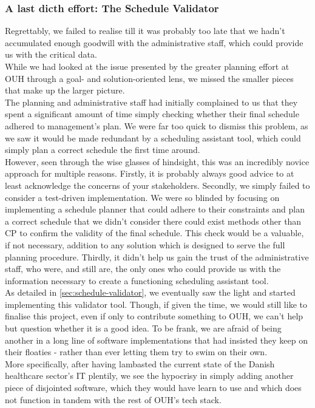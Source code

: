 \subsubsection*{A last dicth effort: The Schedule Validator}
Regrettably, we failed to realise till it was probably too late that we hadn't accumulated enough goodwill with the administrative staff, which could provide us with the critical data. 
\\
While we had looked at the issue presented by the greater planning effort at OUH through a goal- and solution-oriented lens, we missed the smaller pieces that make up the larger picture.
\\
The planning and administrative staff had initially complained to us that they spent a significant amount of time simply checking whether their final schedule adhered to management's plan. We were far too quick to dismiss this problem, as we saw it would be made redundant by a scheduling assistant tool, which could simply plan a correct schedule the first time around.
\\
However, seen through the wise glasses of hindsight, this was an incredibly novice approach for multiple reasons. Firstly, it is probably always good advice to at least acknowledge the concerns of your stakeholders. Secondly, we simply failed to consider a test-driven implementation. We were so blinded by focusing on implementing a schedule planner that could adhere to their constraints and plan a correct schedule that we didn't consider there could exist methods other than CP to confirm the validity of the final schedule. This check would be a valuable, if not necessary, addition to any solution which is designed to serve the full planning procedure. Thirdly, it didn't help us gain the trust of the administrative staff, who were, and still are, the only ones who could provide us with the information necessary to create a functioning scheduling assistant tool. 
\\
As detailed in \autoref{sec:schedule-validator}, we eventually saw the light and started implementing this validator tool. Though, if given the time, we would still like to finalise this project, even if only to contribute something to OUH, we can't help but question whether it is a good idea. To be frank, we are afraid of being another in a long line of software implementations that had insisted they keep on their floaties - rather than ever letting them try to swim on their own.
\\
More specifically, after having lambasted the current state of the Danish healthcare sector's IT plentily, we see the hypocrisy in simply adding another piece of disjointed software, which they would have learn to use and which does not function in tandem with the rest of OUH's tech stack.


